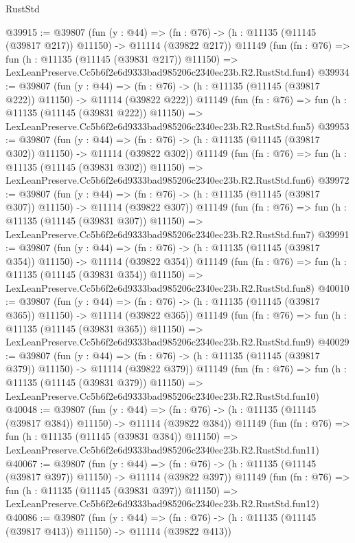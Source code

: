 \begin{lexlean}{RustStd}
\begin{coremodule}
@39915 := @39807
    (fun (y : @44) =>
    (fn : @76) -> (h : @11135 (@11145 (@39817 @217)) @11150) -> @11114 (@39822 @217))
    @11149
    (fun (fn : @76) =>
    fun (h : @11135 (@11145 (@39831 @217)) @11150) =>
    LexLeanPreserve.Cc5b6f2e6d9333bad985206c2340ec23b.R2.RustStd.fun4)
@39934 := @39807
    (fun (y : @44) =>
    (fn : @76) -> (h : @11135 (@11145 (@39817 @222)) @11150) -> @11114 (@39822 @222))
    @11149
    (fun (fn : @76) =>
    fun (h : @11135 (@11145 (@39831 @222)) @11150) =>
    LexLeanPreserve.Cc5b6f2e6d9333bad985206c2340ec23b.R2.RustStd.fun5)
@39953 := @39807
    (fun (y : @44) =>
    (fn : @76) -> (h : @11135 (@11145 (@39817 @302)) @11150) -> @11114 (@39822 @302))
    @11149
    (fun (fn : @76) =>
    fun (h : @11135 (@11145 (@39831 @302)) @11150) =>
    LexLeanPreserve.Cc5b6f2e6d9333bad985206c2340ec23b.R2.RustStd.fun6)
@39972 := @39807
    (fun (y : @44) =>
    (fn : @76) -> (h : @11135 (@11145 (@39817 @307)) @11150) -> @11114 (@39822 @307))
    @11149
    (fun (fn : @76) =>
    fun (h : @11135 (@11145 (@39831 @307)) @11150) =>
    LexLeanPreserve.Cc5b6f2e6d9333bad985206c2340ec23b.R2.RustStd.fun7)
@39991 := @39807
    (fun (y : @44) =>
    (fn : @76) -> (h : @11135 (@11145 (@39817 @354)) @11150) -> @11114 (@39822 @354))
    @11149
    (fun (fn : @76) =>
    fun (h : @11135 (@11145 (@39831 @354)) @11150) =>
    LexLeanPreserve.Cc5b6f2e6d9333bad985206c2340ec23b.R2.RustStd.fun8)
@40010 := @39807
    (fun (y : @44) =>
    (fn : @76) -> (h : @11135 (@11145 (@39817 @365)) @11150) -> @11114 (@39822 @365))
    @11149
    (fun (fn : @76) =>
    fun (h : @11135 (@11145 (@39831 @365)) @11150) =>
    LexLeanPreserve.Cc5b6f2e6d9333bad985206c2340ec23b.R2.RustStd.fun9)
@40029 := @39807
    (fun (y : @44) =>
    (fn : @76) -> (h : @11135 (@11145 (@39817 @379)) @11150) -> @11114 (@39822 @379))
    @11149
    (fun (fn : @76) =>
    fun (h : @11135 (@11145 (@39831 @379)) @11150) =>
    LexLeanPreserve.Cc5b6f2e6d9333bad985206c2340ec23b.R2.RustStd.fun10)
@40048 := @39807
    (fun (y : @44) =>
    (fn : @76) -> (h : @11135 (@11145 (@39817 @384)) @11150) -> @11114 (@39822 @384))
    @11149
    (fun (fn : @76) =>
    fun (h : @11135 (@11145 (@39831 @384)) @11150) =>
    LexLeanPreserve.Cc5b6f2e6d9333bad985206c2340ec23b.R2.RustStd.fun11)
@40067 := @39807
    (fun (y : @44) =>
    (fn : @76) -> (h : @11135 (@11145 (@39817 @397)) @11150) -> @11114 (@39822 @397))
    @11149
    (fun (fn : @76) =>
    fun (h : @11135 (@11145 (@39831 @397)) @11150) =>
    LexLeanPreserve.Cc5b6f2e6d9333bad985206c2340ec23b.R2.RustStd.fun12)
@40086 := @39807
    (fun (y : @44) =>
    (fn : @76) -> (h : @11135 (@11145 (@39817 @413)) @11150) -> @11114 (@39822 @413))

\end{coremodule}
\end{lexlean}
